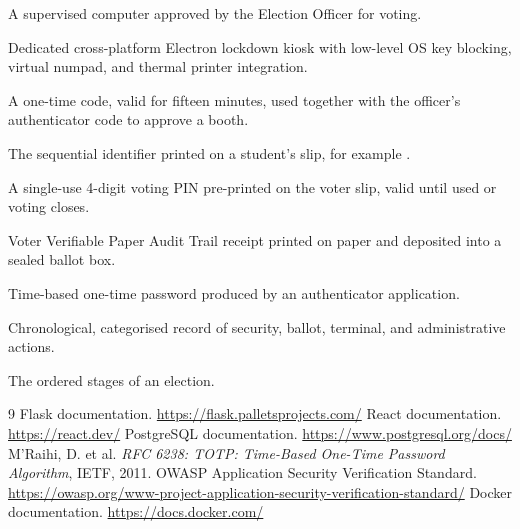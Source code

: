 \begin{description}[leftmargin=3.2cm, style=nextline]
  \item[Booth] A supervised computer approved by the Election Officer for voting.
  \item[Booth App] Dedicated cross-platform Electron lockdown kiosk with low-level OS key blocking, virtual numpad, and thermal printer integration.
  \item[Booth token] A one-time code, valid for fifteen minutes, used together with the officer's authenticator code to approve a booth.
  \item[Voter Slip ID] The sequential identifier printed on a student's slip, for example .
  \item[PIN] A single-use 4-digit voting PIN pre-printed on the voter slip, valid until used or voting closes.
  \item[VVPAT] Voter Verifiable Paper Audit Trail receipt printed on paper and deposited into a sealed ballot box.
  \item[TOTP] Time-based one-time password produced by an authenticator application.
  \item[Audit log] Chronological, categorised record of security, ballot, terminal, and administrative actions.
  \item[Lifecycle] The ordered stages of an election.
\end{description}

\begin{thebibliography}{9}
 Flask documentation. \url{https://flask.palletsprojects.com/}
 React documentation. \url{https://react.dev/}
 PostgreSQL documentation. \url{https://www.postgresql.org/docs/}
 M'Raihi, D. et al. \emph{RFC 6238: TOTP: Time-Based One-Time Password Algorithm}, IETF, 2011.
 OWASP Application Security Verification Standard. \url{https://owasp.org/www-project-application-security-verification-standard/}
 Docker documentation. \url{https://docs.docker.com/}
\end{thebibliography}
